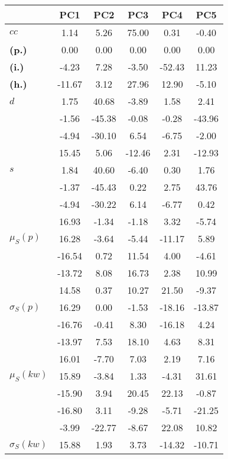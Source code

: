 \begin{table}[h!]
\begin{center}
\begin{tabular}{| l || c | c | c | c | c |}\hline
 & {\bf PC1} & {\bf PC2} & {\bf PC3} & {\bf PC4} & {\bf PC5} \\\hline\hline
{\bf $cc$} & 1.14 & 5.26 & 75.00 & 0.31 & -0.40 \\
{\bf (p.)} & 0.00 & 0.00 & 0.00 & 0.00 & 0.00 \\
{\bf (i.)} & -4.23 & 7.28 & -3.50 & -52.43 & 11.23 \\
{\bf (h.)} & -11.67 & 3.12 & 27.96 & 12.90 & -5.10 \\\hline
{\bf $d$} & 1.75 & 40.68 & -3.89 & 1.58 & 2.41 \\
{\bf } & -1.56 & -45.38 & -0.08 & -0.28 & -43.96 \\
{\bf } & -4.94 & -30.10 & 6.54 & -6.75 & -2.00 \\
{\bf } & 15.45 & 5.06 & -12.46 & 2.31 & -12.93 \\\hline
{\bf $s$} & 1.84 & 40.60 & -6.40 & 0.30 & 1.76 \\
{\bf } & -1.37 & -45.43 & 0.22 & 2.75 & 43.76 \\
 & -4.94  & -30.22  & 6.14  & -6.77  & 0.42 \\
 & 16.93  & -1.34  & -1.18  & 3.32  & -5.74 \\\hline
$\mu_S(p)$ & 16.28  & -3.64  & -5.44  & -11.17  & 5.89 \\
 & -16.54  & 0.72  & 11.54  & 4.00  & -4.61 \\
 & -13.72  & 8.08  & 16.73  & 2.38  & 10.99 \\
 & 14.58  & 0.37  & 10.27  & 21.50  & -9.37 \\\hline
$\sigma_S(p)$ & 16.29  & 0.00  & -1.53  & -18.16  & -13.87 \\
 & -16.76  & -0.41  & 8.30  & -16.18  & 4.24 \\
 & -13.97  & 7.53  & 18.10  & 4.63  & 8.31 \\
 & 16.01  & -7.70  & 7.03  & 2.19  & 7.16 \\\hline
$\mu_S(kw)$ & 15.89  & -3.84  & 1.33  & -4.31  & 31.61 \\
 & -15.90  & 3.94  & 20.45  & 22.13  & -0.87 \\
 & -16.80  & 3.11  & -9.28  & -5.71  & -21.25 \\
 & -3.99  & -22.77  & -8.67  & 22.08  & 10.82 \\\hline
$\sigma_S(kw)$ & 15.88  & 1.93  & 3.73  & -14.32  & -10.71 \\

\end{tabular}
\end{center}
\end{table}
